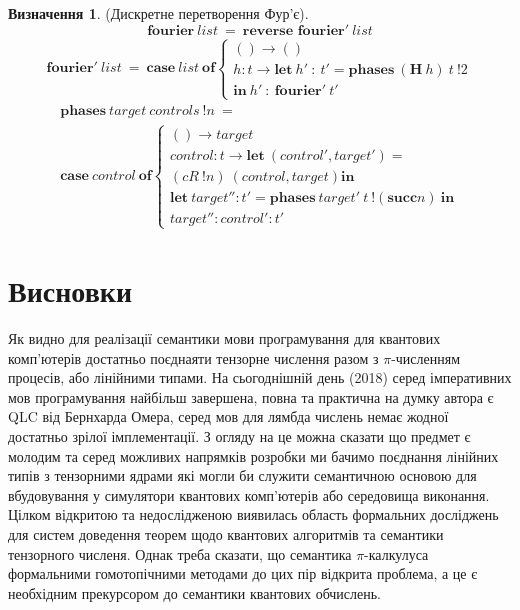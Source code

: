 \documentclass{article}
\theoremstyle{definition}
\newtheorem{definition}{Визначення}
\begin{document}
\begin{definition} (Дискретне перетворення Фур'є).
\begin{equation}
\textbf{fourier}\ list\ =\ \textbf{reverse fourier}'\ list
\end{equation}
\begin{multline}
\textbf{fourier}'\ list\ =
\ \textbf{case}\ list\ \textbf{of}
\begin{cases}
() \rightarrow () \\
h : t \rightarrow \textbf{let}\ h'\ :\ t' = \textbf{phases}\ (\textbf{H}\ h)\ t\ !2 \\
\textbf{in}\ h'\ :\ \textbf{fourier}'\ t'
\end{cases}
\end{multline}
\begin{multline}
\textbf{phases}\ target\ controls\ !n\ = \\
\textbf{case}\ control\ \textbf{of}
\begin{cases}
() \rightarrow target \\
control : t \rightarrow \textbf{let}\ (control',target') = \\
(cR\ !n)\ (control, target) \textbf{in} \\
\textbf{let}\ target'' : t' = \textbf{phases}\ target'\ t\ !(\textbf{succ} n)\ \textbf{in} \\
target '' : control' : t'
\end{cases}
\end{multline}
\end{definition}

\section{Висновки}
Як видно для реалізації семантики мови програмування для квантових
комп'ютерів достатньо поєднаяти тензорне числення разом з $\pi$-численням процесів,
або лінійними типами. На сьогоднішній день (2018) серед імперативних мов програмування
найбільш завершена, повна та практична на думку автора є QLC від Бернхарда Омера, серед
мов для лямбда числень немає жодної достатньо зрілої імплементації.
З огляду на це можна сказати що предмет є молодим та серед можливих напрямків
розробки ми бачимо поєднання лінійних типів з тензорними ядрами які могли би служити
семантичною основою для вбудовування у симулятори квантових комп'ютерів або середовища виконання.
Цілком відкритою та недослідженою виявилась область формальних досліджень
для систем доведення теорем щодо квантових алгоритмів та семантики тензорного численя.
Однак треба сказати, що семантика $\pi$-калкулуса формальними гомотопічними
методами до цих пір відкрита проблема, а це є необхідним прекурсором до
семантики квантових обчислень.



\end{document}
